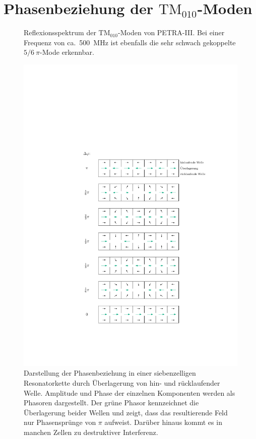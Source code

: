 \section{Phasenbeziehung der $\mathrm{TM}_{010}$-Moden}
\label{app:tm010_moden}
\FloatBarrier
\begin{figure}[htbp]
	\centering
	
	\caption[Reflexionsspektrum der $\mathrm{TM}_{010}$-Moden von PETRA-III]{Reflexionsspektrum der $\mathrm{TM}_{010}$-Moden von PETRA-III. Bei einer Frequenz von ca.\ \SI{500}{MHz} ist ebenfalls die sehr schwach gekoppelte $5/6~\pi$-Mode erkennbar.}
	\label{fig:spektrum_tm010}
\end{figure}

\begin{figure}[p]
	\centering
	\hspace{2cm} %
	\includegraphics[scale=1.0]{./figs/zellen_phasoren.pdf}
	\caption[Phasenbeziehung in einer siebenzelligen Resonatorkette]{Darstellung der Phasenbeziehung in einer siebenzelligen Resonatorkette durch Überlagerung von hin- und rücklaufender Welle. Amplitude und Phase der einzelnen Komponenten werden als Phasoren dargestellt. Der grüne Phasor kennzeichnet die Überlagerung beider Wellen und zeigt, dass das resultierende Feld nur Phasensprünge von $\pi$ aufweist. Darüber hinaus kommt es in manchen Zellen zu destruktiver Interferenz.}
	\label{fig:phasenbeziehung}
\end{figure}

